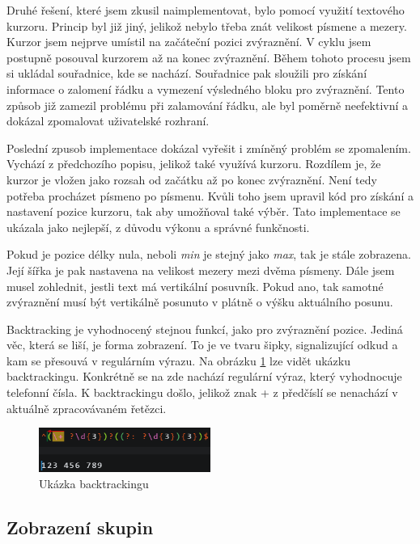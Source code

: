 Druhé řešení, které jsem zkusil naimplementovat, bylo pomocí využití textového kurzoru.
Princip byl již jiný, jelikož nebylo třeba znát velikost písmene a mezery.
Kurzor jsem nejprve umístil na začáteční pozici zvýraznění. 
V cyklu jsem postupně posouval kurzorem až na konec zvýraznění.
Během tohoto procesu jsem si ukládal souřadnice, kde se nachází.
Souřadnice pak sloužili pro získání informace o zalomení řádku a vymezení výsledného bloku pro zvýraznění.
Tento způsob již zamezil problému při zalamování řádku, ale byl poměrně neefektivní a dokázal zpomalovat uživatelské rozhraní.

Poslední zpusob implementace dokázal vyřešit i zmíněný problém se zpomalením.
Vychází z předchozího popisu, jelikož také využívá kurzoru.
Rozdílem je, že kurzor je vložen jako rozsah od začátku až po konec zvýraznění.
Není tedy potřeba procházet písmeno po písmenu.
Kvůli toho jsem upravil kód pro získání a nastavení pozice kurzoru, tak aby umožňoval také výběr.
Tato implementace se ukázala jako nejlepší, z důvodu výkonu a správné funkčnosti.

Pokud je pozice délky nula, neboli \textit{min} je stejný jako \textit{max}, tak je stále zobrazena. 
Její šířka je pak nastavena na velikost mezery mezi dvěma písmeny. 
Dále jsem musel zohlednit, jestli text má vertikální posuvník. 
Pokud ano, tak samotné zvýraznění musí být vertikálně posunuto v plátně o výšku aktuálního posunu.

Backtracking je vyhodnocený stejnou funkcí, jako pro zvýraznění pozice.
Jediná věc, která se liší, je forma zobrazení. 
To je ve tvaru šipky, signalizující odkud a kam se přesouvá v regulárním výrazu.
Na obrázku \ref{fig:backtrackingShowcase} lze vidět ukázku backtrackingu.
Konkrétně se na zde nachází regulární výraz, který vyhodnocuje telefonní čísla.
K backtrackingu došlo, jelikož znak + z předčíslí se nenachází v aktuálně zpracovávaném řetězci.

\begin{figure}[!h]
	\centering
	\includegraphics[width=0.5\textwidth]{Figures/backtrackingShowcase.png}
	\caption{Ukázka backtrackingu}
	\label{fig:backtrackingShowcase}
\end{figure} 

\subsection*{Zobrazení skupin}

